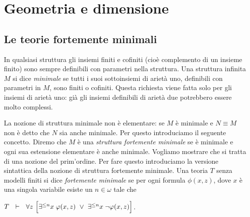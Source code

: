 \chapter{Geometria e dimensione}\label{geometria}%


\section{Le teorie fortemente minimali\label{tfm}}%
 
In qualsiasi struttura gli insiemi finiti e cofiniti (cio\`e complemento di un insieme finito) sono sempre definibili con parametri nella struttura. Una struttura infinita $M$ si dice \emph{minimale\/} se tutti i suoi sottoinsiemi di ariet\`a uno, definibili con parametri in $M$, sono finiti o cofiniti. Questa richiesta viene fatta solo per gli insiemi di ariet\`a uno: gi\`a gli insiemi definibili di ariet\`a due potrebbero essere molto complessi. %

La nozione di struttura minimale non \`e elementare: se $M$ \`e minimale e $N\equiv M$ non \`e detto che $N$ sia anche minimale. Per questo introduciamo il seguente concetto. Diremo che $M$ \`e una \emph{struttura fortemente minimale\/} se \`e minimale e ogni sua estensione elementare \`e anche minimale. Vogliamo mostrare che si tratta di una nozione del prim'ordine. Per fare questo introduciamo la versione sintattica della nozione di struttura fortemente minimale. Una teoria $T$ senza modelli finiti si dice \emph{fortemente minimale\/} se per ogni formula $\phi(x,z)$, dove $x$ \`e una singola variabile esiste un $n\in\omega$ tale che

\hfil$T\ \ \vdash\ \ \forall z\ \Big[\exists^{\le n}x\;\varphi(x,z)\ \vee\ \exists^{\le n}x\;\neg\varphi(x,z)\Big]$.


